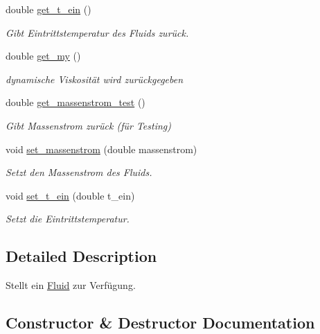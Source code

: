 \begin{DoxyCompactItemize}
double \hyperlink{class_fluid_a60d0c9269a8c8af00bf8828c7f764537}{get\+\_\+t\+\_\+ein} ()
\begin{DoxyCompactList}\small\item\em Gibt Eintrittstemperatur des Fluids zurück. \end{DoxyCompactList}\item 
double \hyperlink{class_fluid_a80d39a71b73f5ac4cffcaceb61b9e0ee}{get\+\_\+my} ()
\begin{DoxyCompactList}\small\item\em dynamische Viskosität wird zurückgegeben \end{DoxyCompactList}\item 
\mbox{\label{class_fluid_ac30c9c13d0bc8094ff28dad837c4eb81}} 
double \hyperlink{class_fluid_ac30c9c13d0bc8094ff28dad837c4eb81}{get\+\_\+massenstrom\+\_\+test} ()
\begin{DoxyCompactList}\small\item\em Gibt Massenstrom zurück (für Testing) \end{DoxyCompactList}\item 
void \hyperlink{class_fluid_af70884f77d5dd43499fcc70969100498}{set\+\_\+massenstrom} (double massenstrom)
\begin{DoxyCompactList}\small\item\em Setzt den Massenstrom des Fluids. \end{DoxyCompactList}\item 
void \hyperlink{class_fluid_a9449846d8fd4bf31d8685eefa55d4a57}{set\+\_\+t\+\_\+ein} (double t\+\_\+ein)
\begin{DoxyCompactList}\small\item\em Setzt die Eintrittstemperatur. \end{DoxyCompactList}\end{DoxyCompactItemize}


\subsection{Detailed Description}
Stellt ein \hyperlink{class_fluid}{Fluid} zur Verfügung. 

\subsection{Constructor \& Destructor Documentation}
\mbox{\label{class_fluid_a2b1fada8a43d2edf1424e4f5915d6e06}} 
